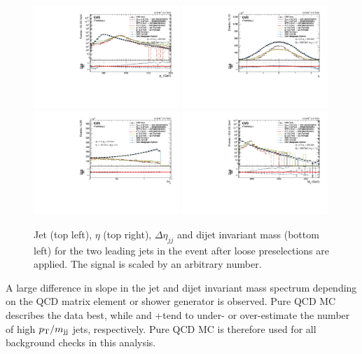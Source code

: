 \begin{figure}[h!]
\centering
\includegraphics[width=0.49\textwidth]{figures/analysis/search2/AN-16-235/plots/qcdcp_Pt.pdf}
\includegraphics[width=0.49\textwidth]{figures/analysis/search2/AN-16-235/plots/qcdcp_Eta.pdf}\\
\includegraphics[width=0.49\textwidth]{figures/analysis/search2/AN-16-235/plots/qcdcp_DeltaEta.pdf}
\includegraphics[width=0.49\textwidth]{figures/analysis/search2/AN-16-235/plots/qcdcp_Mjj.pdf}
\caption{Jet \PT{} (top left), $\eta$ (top right), $\Delta \eta_{jj}$ and dijet invariant mass (bottom left) for the two leading jets in the event after loose preselections are applied. The signal is scaled by an arbitrary number.}
\label{fig:searchII:kinematics-all}
\end{figure}
A large difference in slope in the jet \PT and dijet invariant mass spectrum depending on the QCD matrix element or shower generator is observed. Pure \PYTHIA QCD MC describes the data best, while \HERWIG{++} and \amcatnlo{}+\PYTHIA tend to under- or over-estimate the number of high $p_{\mathrm{T}}/m_\mathrm{jj}$ jets, respectively. Pure \PYTHIA QCD MC is therefore used for all background checks in this analysis.



